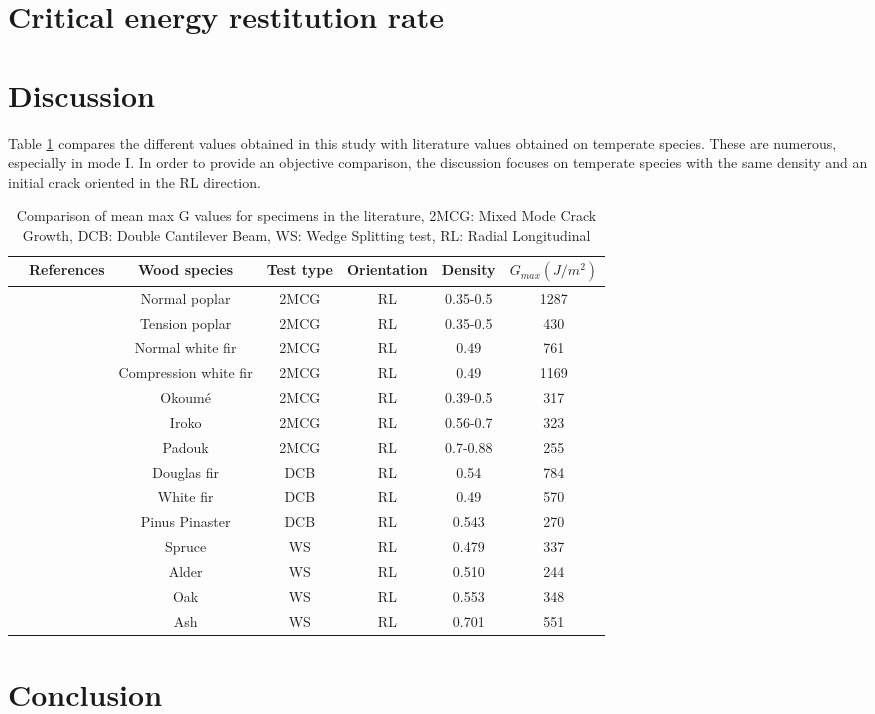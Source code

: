 \section{Critical energy restitution rate}

\section{Discussion}

Table \ref{fig:fig37} compares the different values obtained in this study with literature values obtained on temperate species. These are numerous, especially in mode I. In order to provide an objective comparison, the discussion focuses on temperate species with the same density and an initial crack oriented in the RL direction.


\begin{table} \centering
	\begin{tabular}{ccccccc}
		\toprule %
		& References & Wood species & Test type & Orientation & Density & $G_{max}(J/m^2)$\\\midrule
		& \cite{Mambili2018} & Normal poplar & 2MCG & RL & 0.35-0.5 & 1287\\\midrule
		& \cite{Mambili2018} & Tension poplar & 2MCG & RL & 0.35-0.5 & 430\\\midrule
		& \cite{Mambili2018} & Normal white fir & 2MCG & RL & 0.49 & 761\\\midrule
		& \cite{Mambili2018} & Compression white fir & 2MCG & RL  & 0.49 & 1169\\\midrule
		& \cite{Odounga2018phd} & Okoumé & 2MCG & RL & 0.39-0.5 & 317\\\midrule
		& \cite{Odounga2018phd} & Iroko & 2MCG & RL & 0.56-0.7 & 323\\\midrule
		& \cite{Odounga2018phd} & Padouk & 2MCG & RL & 0.7-0.88 & 255\\\midrule
		& \cite{Angellier2017} & Douglas fir & DCB & RL  & 0.54 & 784\\\midrule
		& \cite{Angellier2017} & White fir & DCB & RL  & 0.49 & 570\\\midrule
		& \cite{Xavieretal2014} & Pinus Pinaster & DCB & RL & 0.543 & 270\\\midrule
		& \cite{Reiterer2002} & Spruce & WS & RL & 0.479 & 337\\\midrule
		& \cite{Reiterer2002} & Alder & WS & RL & 0.510 & 244\\\midrule
		& \cite{Reiterer2002} & Oak & WS & RL & 0.553 & 348\\\midrule
		& \cite{Reiterer2002} & Ash & WS & RL & 0.701 & 551\\\midrule
		\bottomrule %
	\end{tabular}
	\caption{Comparison of mean max G values for specimens in the literature, 2MCG: Mixed Mode Crack Growth, DCB: Double Cantilever Beam, WS: Wedge Splitting test, RL: Radial Longitudinal}
	\label{fig:fig37}
\end{table}

\section{Conclusion}